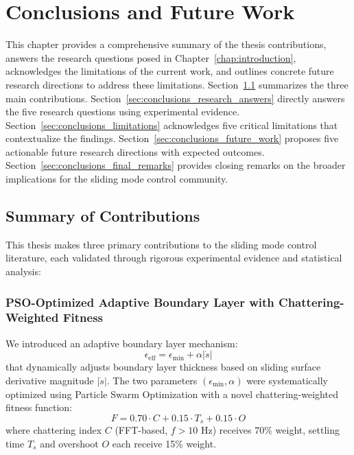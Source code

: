 
\chapter{Conclusions and Future Work}
\label{ch:conclusions}

This chapter provides a comprehensive summary of the thesis contributions, answers the research questions posed in Chapter~\ref{chap:introduction}, acknowledges the limitations of the current work, and outlines concrete future research directions to address these limitations. Section~\ref{sec:conclusions_contributions} summarizes the three main contributions. Section~\ref{sec:conclusions_research_answers} directly answers the five research questions using experimental evidence. Section~\ref{sec:conclusions_limitations} acknowledges five critical limitations that contextualize the findings. Section~\ref{sec:conclusions_future_work} proposes five actionable future research directions with expected outcomes. Section~\ref{sec:conclusions_final_remarks} provides closing remarks on the broader implications for the sliding mode control community.

\section{Summary of Contributions}
\label{sec:conclusions_contributions}

This thesis makes three primary contributions to the sliding mode control literature, each validated through rigorous experimental evidence and statistical analysis:

\subsection{PSO-Optimized Adaptive Boundary Layer with Chattering-Weighted Fitness}
\label{subsec:contribution_adaptive_boundary}

We introduced an adaptive boundary layer mechanism:
\begin{equation}
    \epsilon_{\text{eff}} = \epsilon_{\min} + \alpha|\dot{s}|
    \label{eq:conclusions_adaptive_boundary}
\end{equation}
that dynamically adjusts boundary layer thickness based on sliding surface derivative magnitude $|\dot{s}|$. The two parameters $(\epsilon_{\min}, \alpha)$ were systematically optimized using Particle Swarm Optimization with a novel chattering-weighted fitness function:
\begin{equation}
    F = 0.70 \cdot C + 0.15 \cdot T_s + 0.15 \cdot O
    \label{eq:conclusions_fitness}
\end{equation}
where chattering index $C$ (FFT-based, $f > 10$ Hz) receives 70\% weight, settling time $T_s$ and overshoot $O$ each receive 15\% weight.

